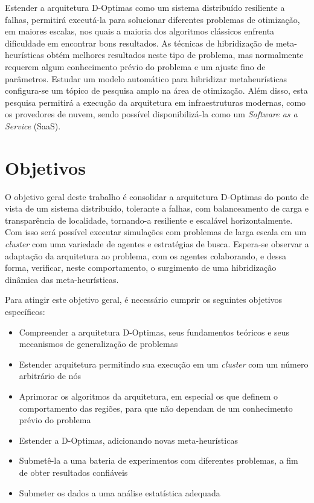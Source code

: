 Estender a arquitetura D-Optimas como um sistema distribuído resiliente a falhas, permitirá executá-la para solucionar diferentes problemas de otimização, em maiores escalas, nos quais a maioria dos algoritmos clássicos enfrenta dificuldade em encontrar bons resultados. As técnicas de hibridização de meta-heurísticas obtém melhores resultados neste tipo de problema, mas normalmente requerem algum conhecimento prévio do problema e um ajuste fino de parâmetros. Estudar um modelo automático para hibridizar metaheurísticas configura-se um tópico de pesquisa amplo na área de otimização. Além disso, esta pesquisa permitirá a execução da arquitetura em infraestruturas modernas, como os provedores de nuvem, sendo possível  disponibilizá-la como um \textit{Software as a Service} (SaaS).

\section{Objetivos}

O objetivo geral deste trabalho é consolidar a arquitetura D-Optimas do ponto de vista de um sistema distribuído, tolerante a falhas, com balanceamento de carga e transparência de localidade, tornando-a resiliente e escalável horizontalmente. Com isso será possível executar simulações com problemas de larga escala em um \textit{cluster} com uma variedade de agentes e estratégias de busca. Espera-se observar a adaptação da arquitetura ao problema, com os agentes colaborando, e dessa forma, verificar, neste comportamento,  o surgimento de uma hibridização dinâmica das meta-heurísticas.

Para atingir este objetivo geral, é necessário cumprir os seguintes objetivos específicos: 

\begin{itemize}
    \item Compreender a arquitetura D-Optimas, seus fundamentos teóricos e seus mecanismos de generalização de problemas
    \item Estender arquitetura permitindo sua execução em um \textit{cluster} com um número arbitrário de nós
    \item Aprimorar os algoritmos da arquitetura, em especial os que definem o comportamento das regiões, para que não dependam de um conhecimento prévio do problema 
    \item Estender a D-Optimas, adicionando novas meta-heurísticas
    \item Submetê-la a uma bateria de experimentos com diferentes problemas, a fim de obter resultados confiáveis
    \item Submeter os dados a uma análise estatística adequada 
\end{itemize}

